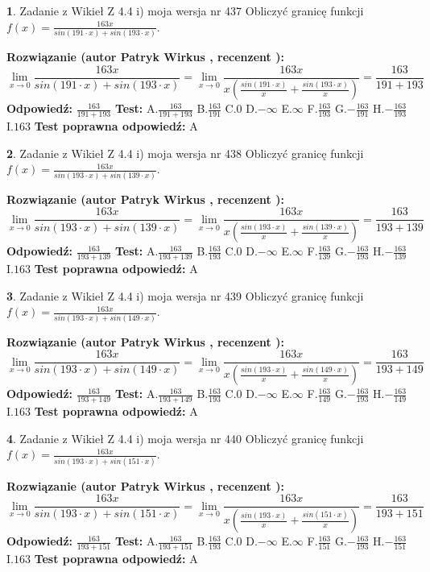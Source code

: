 \documentclass[12pt, a4paper]{article}
\theoremstyle{definition} %
\newtheorem{zad}{}
\newcommand{\zadStart}[1]{\begin{zad}#1\newline}
\newcommand{\zadStop}{\end{zad}}
\newcommand{\rozwStart}[2]{\noindent \textbf{Rozwiązanie (autor #1 , recenzent #2): }\newline}
\newcommand{\rozwStop}{\newline}
\newcommand{\odpStart}{\noindent \textbf{Odpowiedź:}\newline}
\newcommand{\odpStop}{\newline}
\newcommand{\testStart}{\noindent \textbf{Test:}\newline}
\newcommand{\testStop}{\newline}
\newcommand{\kluczStart}{\noindent \textbf{Test poprawna odpowiedź:}\newline}
\newcommand{\kluczStop}{\newline}
\begin{document}
\zadStart{Zadanie z Wikieł Z 4.4 i) moja wersja nr 437}
Obliczyć granicę funkcji $f(x)=\frac{163x}{sin(191\cdot x) +sin(193\cdot x)}$.
\zadStop
\rozwStart{Patryk Wirkus}{}
$$\lim\limits_{x\to 0}\frac{163x}{sin(191\cdot x) +sin(193\cdot x)}=\lim\limits_{x\to 0}\frac{163x}{x(\frac{sin(191\cdot x)}{x}+\frac{sin(193\cdot x)}{x})}=\frac{163}{191+193}$$
\rozwStop
\odpStart
$\frac{163}{191+193}$
\odpStop
\testStart
A.$\frac{163}{191+193}$
B.$\frac{163}{191}$
C.$0$
D.$-\infty$
E.$\infty$
F.$\frac{163}{193}$
G.$-\frac{163}{191}$
H.$-\frac{163}{193}$
I.$163$
\testStop
\kluczStart
A
\kluczStop



\zadStart{Zadanie z Wikieł Z 4.4 i) moja wersja nr 438}
Obliczyć granicę funkcji $f(x)=\frac{163x}{sin(193\cdot x) +sin(139\cdot x)}$.
\zadStop
\rozwStart{Patryk Wirkus}{}
$$\lim\limits_{x\to 0}\frac{163x}{sin(193\cdot x) +sin(139\cdot x)}=\lim\limits_{x\to 0}\frac{163x}{x(\frac{sin(193\cdot x)}{x}+\frac{sin(139\cdot x)}{x})}=\frac{163}{193+139}$$
\rozwStop
\odpStart
$\frac{163}{193+139}$
\odpStop
\testStart
A.$\frac{163}{193+139}$
B.$\frac{163}{193}$
C.$0$
D.$-\infty$
E.$\infty$
F.$\frac{163}{139}$
G.$-\frac{163}{193}$
H.$-\frac{163}{139}$
I.$163$
\testStop
\kluczStart
A
\kluczStop



\zadStart{Zadanie z Wikieł Z 4.4 i) moja wersja nr 439}
Obliczyć granicę funkcji $f(x)=\frac{163x}{sin(193\cdot x) +sin(149\cdot x)}$.
\zadStop
\rozwStart{Patryk Wirkus}{}
$$\lim\limits_{x\to 0}\frac{163x}{sin(193\cdot x) +sin(149\cdot x)}=\lim\limits_{x\to 0}\frac{163x}{x(\frac{sin(193\cdot x)}{x}+\frac{sin(149\cdot x)}{x})}=\frac{163}{193+149}$$
\rozwStop
\odpStart
$\frac{163}{193+149}$
\odpStop
\testStart
A.$\frac{163}{193+149}$
B.$\frac{163}{193}$
C.$0$
D.$-\infty$
E.$\infty$
F.$\frac{163}{149}$
G.$-\frac{163}{193}$
H.$-\frac{163}{149}$
I.$163$
\testStop
\kluczStart
A
\kluczStop



\zadStart{Zadanie z Wikieł Z 4.4 i) moja wersja nr 440}
Obliczyć granicę funkcji $f(x)=\frac{163x}{sin(193\cdot x) +sin(151\cdot x)}$.
\zadStop
\rozwStart{Patryk Wirkus}{}
$$\lim\limits_{x\to 0}\frac{163x}{sin(193\cdot x) +sin(151\cdot x)}=\lim\limits_{x\to 0}\frac{163x}{x(\frac{sin(193\cdot x)}{x}+\frac{sin(151\cdot x)}{x})}=\frac{163}{193+151}$$
\rozwStop
\odpStart
$\frac{163}{193+151}$
\odpStop
\testStart
A.$\frac{163}{193+151}$
B.$\frac{163}{193}$
C.$0$
D.$-\infty$
E.$\infty$
F.$\frac{163}{151}$
G.$-\frac{163}{193}$
H.$-\frac{163}{151}$
I.$163$
\testStop
\kluczStart
A
\kluczStop
\end{document}
